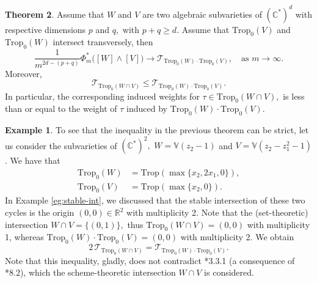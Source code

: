 \documentclass[11pt]{amsart}
\theoremstyle{definition}
\newtheorem{theorem}{Theorem}[section]
\newtheorem{example}[theorem]{Example}
\newcommand{\R}{\mathbb{R}}
\newcommand{\lto}{\longrightarrow}
\newcommand{\C}{\mathbb{C}}
\newcommand{\sT}{\mathscr{T}}
\newcommand{\Trop}{\mathrm{Trop}}
\begin{document}
\begin{theorem}\label{thm:proper-int}
Assume that $W$ and $V$ are two algebraic subvarieties of $(\C^*)^d$ with respective dimensions $p$ and $q,$ with $p+q \geq d.$ Assume that $\Trop_0(V)$ and $\Trop_0(W)$ intersect transversely, then 
$$
\frac{1}{m^{2d-(p+q)}}\Phi^*_{m} \big([W]  \wedge [V] \big) \lto \sT_{\Trop_{0}(W) \cdot \Trop_{0}(V)}, \quad \text{as $m\to \infty.$}
$$
Moreover, 
$$\sT_{\Trop_0(W \cap V)} \leq \sT_{\Trop_{0}(W) \cdot \Trop_{0}(V)}.$$ 
In particular, the corresponding induced weights for $\tau \in \Trop_0(W \cap V),$ is less than or equal to the weight of $\tau$ induced by $\Trop_{0}(W) \cdot \Trop_{0}(V).$

\begin{example}
To see that the inequality in the previous theorem can be strict, let us consider the subvarieties of $(\C^*)^2,$ $W= \mathbb{V}(z_2-1)$ and $V= \mathbb{V}(z_2 - z_1^2 - 1 )$. We have that
\begin{align*}
   \Trop_0(W) &=  \Trop (\max\{ x_2, 2x_1, 0\}), \\
   \Trop_0(V) &= \Trop( \max \{x_2, 0 \}).
\end{align*}
In Example \ref{eg:stable-int}, we discussed that the stable intersection of these two cycles is the origin $(0,0) \in \R^2$ with multiplicity 2. Note that the (set-theoretic) intersection $W \cap V  = \{(0, 1)\},$ thus $\Trop_0 (W \cap V) = (0,0)$ with multiplicity 1, whereas $\Trop_0(W) \cdot \Trop_0(V) = (0,0)$ with multiplicity 2. We obtain 
$$
2\, \sT_{\Trop_0(W \cap V)} = \sT_{\Trop_{0}(W) \cdot \Trop_{0}(V)}.
$$
Note that this inequality, gladly, does not contradict \cite{Osserman-Payne}*{3.3.1} (a consequence of \cite{Fulton_int}*{8.2}),  which the scheme-theoretic intersection $W \cap V$ is considered. 
\end{example}
    



\end{theorem}
\end{document}
